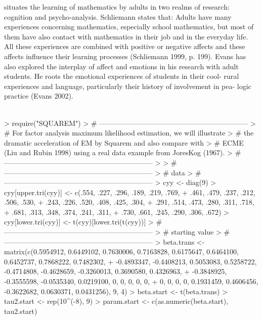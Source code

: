 \documentclass{article}
\begin{document}
 situates the learning of mathematics by adults in two realms of research: cognition
 and psycho-analysis. Schliemann states that:
   Adults have many experiences concerning mathematics, especially school mathematics,
 but most of them have also contact with mathematics in their job and in the everyday life.
 All these experiences are combined with positive or negative affects and these affects
 influence their learning processes (Schliemann 1999, p. 199).
 Evans has also explored the interplay of affect and emotions in his research
 with adult students. He roots the emotional experiences of students in their cool-
   rural experiences and language, particularly their history of involvement in pea-
   logic practice (Evans 2002).
\textit{\\\\}
\begin{Schunk}
\begin{Sinput}
> require("SQUAREM")
> # ---------------------------------------------------------------
> # For factor analysis maximum likelihood estimation, we will illustrate 
> # the dramatic acceleration of EM by Squarem and also compare with 
> # ECME (Liu and Rubin 1998) using a real data example from JoresKog (1967). 
> # ---------------------------------------------------------------
> 
> # ---------------------------------------------------------------
> # data
> # ---------------------------------------------------------------
> cyy <- diag(9)
> cyy[upper.tri(cyy)] <- c(.554, .227, .296, .189, .219, .769, 
+                          .461, .479, .237, .212, .506, .530,
+                          .243, .226, .520, .408, .425, .304,
+                          .291, .514, .473, .280, .311, .718,
+                          .681, .313, .348, .374, .241, .311,
+                          .730, .661, .245, .290, .306, .672)
> cyy[lower.tri(cyy)] <- t(cyy)[lower.tri(t(cyy))]
> # ---------------------------------------------------------------
> # starting value
> # ---------------------------------------------------------------
> beta.trans <- matrix(c(0.5954912, 0.6449102, 0.7630006, 0.7163828, 0.6175647, 0.6464100, 0.6452737, 0.7868222, 0.7482302, 
+                        -0.4893347, -0.4408213, 0.5053083, 0.5258722, -0.4714808, -0.4628659, -0.3260013, 0.3690580, 0.4326963, 
+                        -0.3848925, -0.3555598, -0.0535340, 0.0219100, 0, 0, 0, 0, 0, 
+                        0, 0, 0, 0, 0.1931459, 0.4606456, -0.3622682, 0.0630371, 0.0431256), 9, 4)
> beta.start <- t(beta.trans)
> tau2.start <- rep(10^(-8), 9)
> param.start <- c(as.numeric(beta.start), tau2.start)

\end{Sinput}
\end{Schunk}
\end{document}

